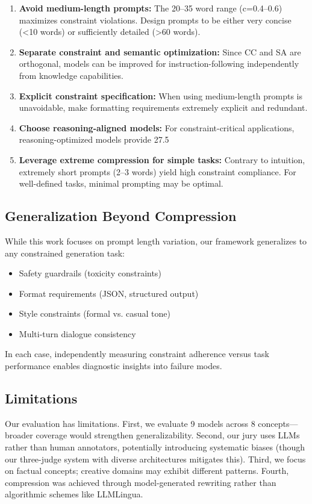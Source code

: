 \documentclass[11pt]{article}
\begin{document}
\begin{enumerate}
\item \textbf{Avoid medium-length prompts:} The 20--35 word range (c=0.4--0.6) maximizes constraint violations. Design prompts to be either very concise (<10 words) or sufficiently detailed (>60 words).
\item \textbf{Separate constraint and semantic optimization:} Since CC and SA are orthogonal, models can be improved for instruction-following independently from knowledge capabilities.
\item \textbf{Explicit constraint specification:} When using medium-length prompts is unavoidable, make formatting requirements extremely explicit and redundant.
\item \textbf{Choose reasoning-aligned models:} For constraint-critical applications, reasoning-optimized models provide 27.5%
\item \textbf{Leverage extreme compression for simple tasks:} Contrary to intuition, extremely short prompts (2--3 words) yield high constraint compliance. For well-defined tasks, minimal prompting may be optimal.
\end{enumerate}

\subsection{Generalization Beyond Compression}

While this work focuses on prompt length variation, our framework generalizes to any constrained generation task:
\begin{itemize}
\item Safety guardrails (toxicity constraints)
\item Format requirements (JSON, structured output)
\item Style constraints (formal vs. casual tone)
\item Multi-turn dialogue consistency
\end{itemize}

In each case, independently measuring constraint adherence versus task performance enables diagnostic insights into failure modes.

\subsection{Limitations}

Our evaluation has limitations. First, we evaluate 9 models across 8 concepts---broader coverage would strengthen generalizability. Second, our jury uses LLMs rather than human annotators, potentially introducing systematic biases (though our three-judge system with diverse architectures mitigates this). Third, we focus on factual concepts; creative domains may exhibit different patterns. Fourth, compression was achieved through model-generated rewriting rather than algorithmic schemes like LLMLingua.
\end{document}
